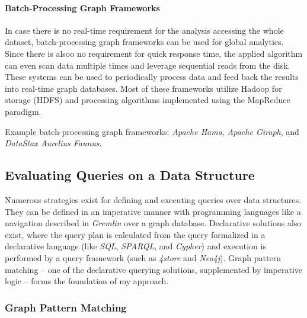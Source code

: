 \paragraph{Batch-Processing Graph Frameworks}
In case there is no real-time requirement for the analysis accessing the whole dataset, batch-processing graph frameworks can be used for global analytics. Since there is alsoo no requirement for quick response time, the applied algorithm can even scan data multiple times and leverage sequential reads from the disk. These systems can be used to periodically process data and feed back the results into real-time graph databases. Most of these frameworks utilize Hadoop for storage (HDFS) and processing algorithms implemented using the MapReduce paradigm.

Example batch-processing graph frameworks: \emph{Apache Hama}, \emph{Apache Giraph}, and \emph{DataStax Aurelius Faunus}.

\subsection{Evaluating Queries on a Data Structure}
Numerous strategies exist for defining and executing queries over data structures. They can be defined in an imperative manner with programming languages like a navigation described in \emph{Gremlin} over a graph database. Declarative solutions also exist, where the query plan is calculated from the query formalized in a declarative language (like \emph{SQL}, \emph{SPARQL}, and \emph{Cypher}) and execution is performed by a query framework (such as \emph{4store} and \emph{Neo4j}). Graph pattern matching -- one of the declarative querying solutions, supplemented by imperative logic -- forms the foundation of my approach.

\subsubsection{Graph Pattern Matching}

